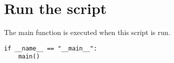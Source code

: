 \documentclass[article,a4paper,oneside,11pt,font=lmodern,language=english,titlepage=default,chapterstyle=article,pagestyle=default,bibliography=authoryear,theorem=colorbox,minted=true]{hri}
\begin{document}
\section{Run the script}
\label{sec:org04d3dcc}

The main function is executed when this script is run.

\begin{verbatim}
if __name__ == "__main__":
    main()
\end{verbatim}

\printbibliography
\end{document}
